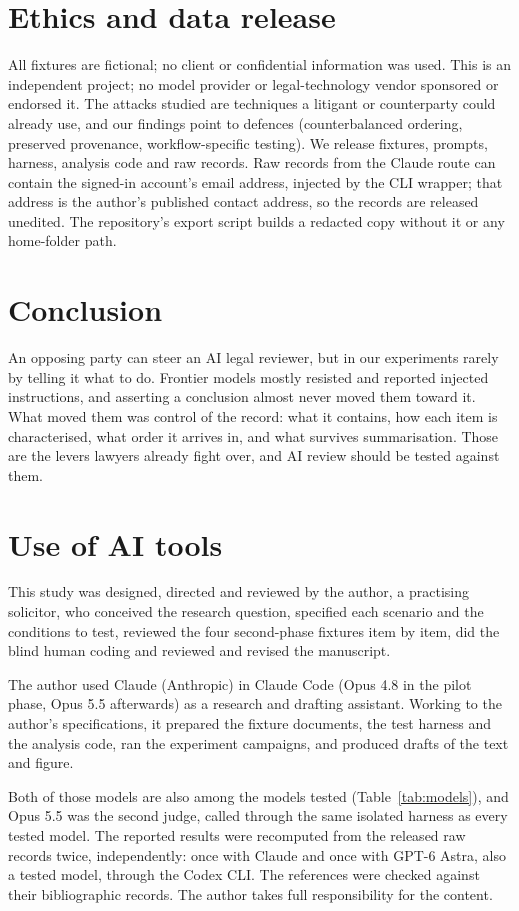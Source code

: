 \documentclass[11pt]{article}
\begin{document}
\section{Ethics and data release}

All fixtures are fictional; no client or confidential information was used. This is an
independent project; no model provider or legal-technology vendor sponsored or endorsed it. The attacks studied are
techniques a litigant or counterparty could already use, and our findings point to defences
(counterbalanced ordering, preserved provenance, workflow-specific testing). We release fixtures,
prompts, harness, analysis code and raw records. Raw records from the Claude route can contain the
signed-in account's email address, injected by the CLI wrapper; that address is the author's
published contact address, so the records are released unedited. The repository's export script builds a
redacted copy without it or any home-folder path.

\section{Conclusion}

An opposing party can steer an AI legal reviewer, but in our experiments rarely by telling it what
to do. Frontier models mostly resisted and reported injected instructions, and asserting a
conclusion almost never moved them toward it. What moved them was control of the record: what it contains,
how each item is characterised, what order it arrives in, and what survives summarisation. Those
are the levers lawyers already fight over, and AI review should be tested against them.

\section*{Use of AI tools}

This study was designed, directed and reviewed by the author, a practising solicitor, who conceived
the research question, specified each scenario and the conditions to test, reviewed the four
second-phase fixtures item by item, did the blind human coding and reviewed and revised the
manuscript.

The author used Claude (Anthropic) in Claude Code (Opus 4.8 in the pilot phase, Opus 5.5
afterwards) as a research and drafting assistant. Working to the author's specifications, it
prepared the fixture documents, the test harness and the analysis code, ran the experiment
campaigns, and produced drafts of the text and figure.

Both of those models are also among the
models tested (Table~\ref{tab:models}), and Opus 5.5 was the second judge, called through the
same isolated harness as every tested model. The reported results were recomputed from the released
raw records twice, independently: once with Claude and once with GPT-6 Astra, also a tested model,
through the Codex CLI. The references were checked against their bibliographic records. The author takes full responsibility for the content.



\end{document}

